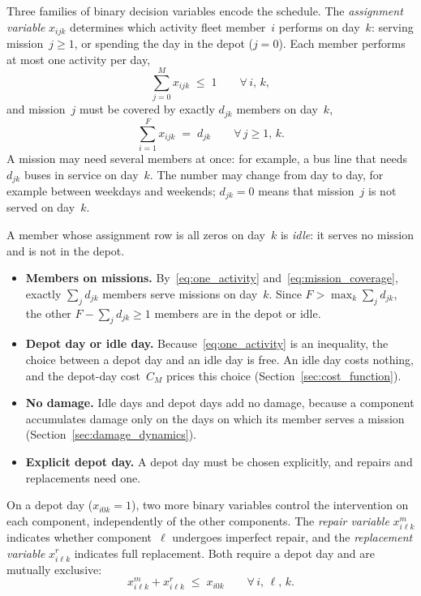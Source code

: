 \documentclass[11pt,a4paper]{article}
\theoremstyle{plain}
\theoremstyle{definition}
\theoremstyle{remark}
\begin{document}
Three families of binary decision variables encode the schedule.
The \emph{assignment variable} $x_{ijk}$ determines which activity fleet member~$i$ performs on day~$k$: serving mission~$j \ge 1$, or spending the day in the depot ($j=0$).
Each member performs at most one activity per day,
\begin{equation}\label{eq:one_activity}
  \sum_{j=0}^{M} x_{ijk} \;\le\; 1 \qquad \forall\, i,\,k,
\end{equation}
and mission~$j$ must be covered by exactly $d_{jk}$ members on day~$k$,
\begin{equation}\label{eq:mission_coverage}
  \sum_{i=1}^{F} x_{ijk} \;=\; d_{jk} \qquad \forall\, j \ge 1,\,k.
\end{equation}
A mission may need several members at once: for example, a bus line that needs $d_{jk}$ buses in service on day~$k$.
The number may change from day to day, for example between weekdays and weekends; $d_{jk} = 0$ means that mission~$j$ is not served on day~$k$.

A member whose assignment row is all zeros on day~$k$ is \emph{idle}: it serves no mission and is not in the depot.
\begin{itemize}
  \item \textbf{Members on missions.} By~\eqref{eq:one_activity} and~\eqref{eq:mission_coverage}, exactly $\sum_{j} d_{jk}$ members serve missions on day~$k$. Since $F > \max_k \sum_{j} d_{jk}$, the other $F - \sum_{j} d_{jk} \ge 1$ members are in the depot or idle.
  \item \textbf{Depot day or idle day.} Because~\eqref{eq:one_activity} is an inequality, the choice between a depot day and an idle day is free.
    An idle day costs nothing, and the depot-day cost~$C_M$ prices this choice (Section~\ref{sec:cost_function}).
  \item \textbf{No damage.} Idle days and depot days add no damage, because a component accumulates damage only on the days on which its member serves a mission (Section~\ref{sec:damage_dynamics}).
  \item \textbf{Explicit depot day.} A depot day must be chosen explicitly, and repairs and replacements need one.
\end{itemize}

On a depot day ($x_{i0k}=1$), two more binary variables control the intervention on each component, independently of the other components.
The \emph{repair variable} $x^m_{i\ell k}$ indicates whether component~$\ell$ undergoes imperfect repair, and the \emph{replacement variable} $x^r_{i\ell k}$ indicates full replacement.
Both require a depot day and are mutually exclusive:
\begin{equation}\label{eq:maint_compat}
  x^m_{i\ell k} + x^r_{i\ell k} \;\le\; x_{i0k}
  \qquad \forall\, i,\,\ell,\,k.
\end{equation}
\end{document}
